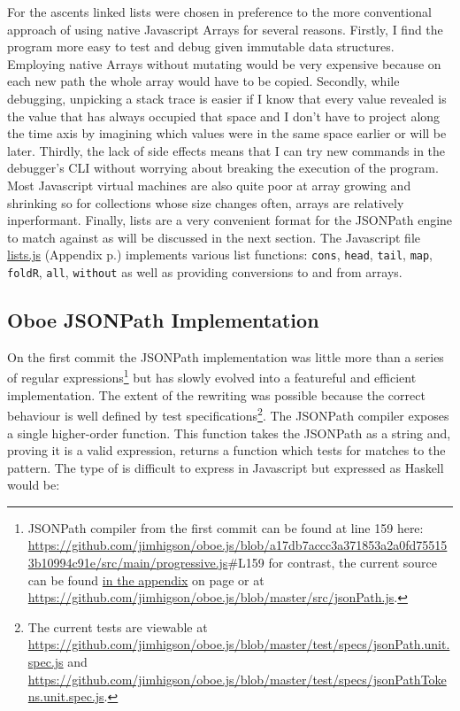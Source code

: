 \documentclass[]{article}
\begin{document}
For the ascents linked lists were chosen in preference to the more
conventional approach of using native Javascript Arrays for several
reasons. Firstly, I find the program more easy to test and debug given
immutable data structures. Employing native Arrays without mutating
would be very expensive because on each new path the whole array would
have to be copied. Secondly, while debugging, unpicking a stack trace is
easier if I know that every value revealed is the value that has always
occupied that space and I don't have to project along the time axis by
imagining which values were in the same space earlier or will be later.
Thirdly, the lack of side effects means that I can try new commands in
the debugger's CLI without worrying about breaking the execution of the
program. Most Javascript virtual machines are also quite poor at array
growing and shrinking so for collections whose size changes often,
arrays are relatively inperformant. Finally, lists are a very convenient
format for the JSONPath engine to match against as will be discussed in
the next section. The Javascript file \hyperref[lists.js]{lists.js}
(Appendix p.\pageref{lists.js}) implements various list functions:
\texttt{cons}, \texttt{head}, \texttt{tail}, \texttt{map},
\texttt{foldR}, \texttt{all}, \texttt{without} as well as providing
conversions to and from arrays.

\subsection{Oboe JSONPath Implementation}

On the first commit the JSONPath implementation was little more than a
series of regular expressions\footnote{JSONPath compiler from the first
  commit can be found at line 159 here:
  \url{https://github.com/jimhigson/oboe.js/blob/a17db7accc3a371853a2a0fd755153b10994c91e/src/main/progressive.js}\#L159
  for contrast, the current source can be found
  \hyperref[jsonPath.js]{in the appendix} on page \pageref{src_jsonPath}
  or at
  \url{https://github.com/jimhigson/oboe.js/blob/master/src/jsonPath.js}.}
but has slowly evolved into a featureful and efficient implementation.
The extent of the rewriting was possible because the correct behaviour
is well defined by test specifications\footnote{The current tests are
  viewable at
  \url{https://github.com/jimhigson/oboe.js/blob/master/test/specs/jsonPath.unit.spec.js}
  and
  \url{https://github.com/jimhigson/oboe.js/blob/master/test/specs/jsonPathTokens.unit.spec.js}.}.
The JSONPath compiler exposes a single higher-order function. This
function takes the JSONPath as a string and, proving it is a valid
expression, returns a function which tests for matches to the pattern.
The type of is difficult to express in Javascript but expressed as
Haskell would be:
\end{document}
